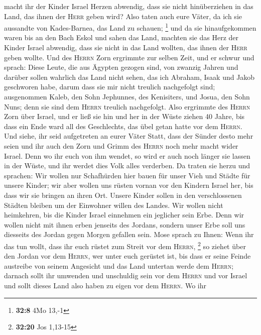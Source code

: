 macht ihr der Kinder Israel Herzen abwendig, dass sie nicht
hinüberziehen in das Land, das ihnen der \textsc{Herr} geben wird?
 Also taten auch eure Väter, da ich sie aussandte von
Kades-Barnea, das Land zu schauen; \footnote{\textbf{32:8} 4Mo 13,-1}
 und da sie hinaufgekommen waren bis an den Bach Eskol und
sahen das Land, machten sie das Herz der Kinder Israel abwendig, dass
sie nicht in das Land wollten, das ihnen der \textsc{Herr} geben wollte.
 Und des \textsc{Herrn} Zorn ergrimmte zur selben Zeit,
und er schwur und sprach:  Diese Leute, die aus Ägypten
gezogen sind, von zwanzig Jahren und darüber sollen wahrlich das Land
nicht sehen, das ich Abraham, Isaak und Jakob geschworen habe, darum
dass sie mir nicht treulich nachgefolgt sind; 
ausgenommen Kaleb, den Sohn Jephunnes, des Kenisiters, und Josua, den
Sohn Nuns; denn sie sind dem \textsc{Herrn} treulich nachgefolgt.
 Also ergrimmte des \textsc{Herrn} Zorn über Israel, und
er ließ sie hin und her in der Wüste ziehen 40 Jahre, bis dass ein Ende
ward all des Geschlechts, das übel getan hatte vor dem \textsc{Herrn}.
 Und siehe, ihr seid aufgetreten an eurer Väter Statt,
dass der Sünder desto mehr seien und ihr auch den Zorn und Grimm des
\textsc{Herrn} noch mehr macht wider Israel.  Denn wo ihr
euch von ihm wendet, so wird er auch noch länger sie lassen in der
Wüste, und ihr werdet dies Volk alles verderben.  Da
traten sie herzu und sprachen: Wir wollen nur Schafhürden hier bauen für
unser Vieh und Städte für unsere Kinder;  wir aber wollen
uns rüsten vornan vor den Kindern Israel her, bis dass wir sie bringen
an ihren Ort. Unsere Kinder sollen in den verschlossenen Städten bleiben
um der Einwohner willen des Landes.  Wir wollen nicht
heimkehren, bis die Kinder Israel einnehmen ein jeglicher sein Erbe.
 Denn wir wollen nicht mit ihnen erben jenseits des
Jordans, sondern unser Erbe soll uns diesseits des Jordan gegen Morgen
gefallen sein.  Mose sprach zu Ihnen: Wenn ihr das tun
wollt, dass ihr euch rüstet zum Streit vor dem \textsc{Herrn},
\footnote{\textbf{32:20} Jos 1,13-15}  so ziehet über den
Jordan vor dem \textsc{Herrn}, wer unter euch gerüstet ist, bis dass er
seine Feinde austreibe von seinem Angesicht  und das Land
untertan werde dem \textsc{Herrn}; darnach sollt ihr umwenden und
unschuldig sein vor dem \textsc{Herrn} und vor Israel und sollt dieses
Land also haben zu eigen vor dem \textsc{Herrn}.  Wo ihr
